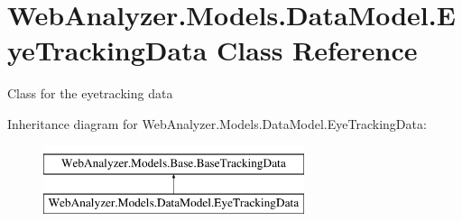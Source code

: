 \hypertarget{class_web_analyzer_1_1_models_1_1_data_model_1_1_eye_tracking_data}{}\section{Web\+Analyzer.\+Models.\+Data\+Model.\+Eye\+Tracking\+Data Class Reference}
\label{class_web_analyzer_1_1_models_1_1_data_model_1_1_eye_tracking_data}


Class for the eyetracking data  


Inheritance diagram for Web\+Analyzer.\+Models.\+Data\+Model.\+Eye\+Tracking\+Data\+:\begin{figure}[H]
\begin{center}
\leavevmode
\includegraphics[height=2.000000cm]{class_web_analyzer_1_1_models_1_1_data_model_1_1_eye_tracking_data}
\end{center}
\end{figure}
